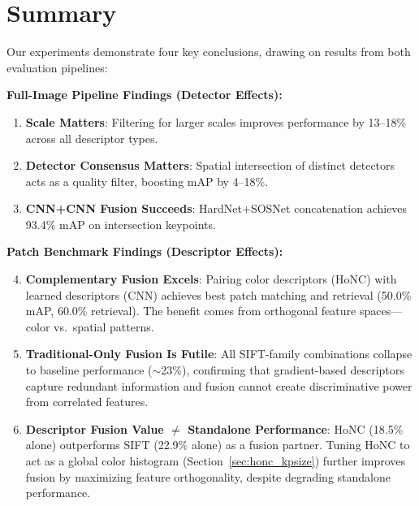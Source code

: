 \section{Summary}

Our experiments demonstrate four key conclusions, drawing on results from both evaluation pipelines:

\textbf{Full-Image Pipeline Findings (Detector Effects):}
\begin{enumerate}
    \item \textbf{Scale Matters}: Filtering for larger scales improves performance by 13--18\% across all descriptor types.
    \item \textbf{Detector Consensus Matters}: Spatial intersection of distinct detectors acts as a quality filter, boosting mAP by 4--18\%.
    \item \textbf{CNN+CNN Fusion Succeeds}: HardNet+SOSNet concatenation achieves 93.4\% mAP on intersection keypoints.
\end{enumerate}

\textbf{Patch Benchmark Findings (Descriptor Effects):}
\begin{enumerate}
    \setcounter{enumi}{3}
    \item \textbf{Complementary Fusion Excels}: Pairing color descriptors (HoNC) with learned descriptors (CNN) achieves best patch matching and retrieval (50.0\% mAP, 60.0\% retrieval). The benefit comes from orthogonal feature spaces---color vs.\ spatial patterns.
    \item \textbf{Traditional-Only Fusion Is Futile}: All SIFT-family combinations collapse to baseline performance ($\sim$23\%), confirming that gradient-based descriptors capture redundant information and fusion cannot create discriminative power from correlated features.
    \item \textbf{Descriptor Fusion Value $\neq$ Standalone Performance}: HoNC (18.5\% alone) outperforms SIFT (22.9\% alone) as a fusion partner. Tuning HoNC to act as a global color histogram (Section~\ref{sec:honc_kpsize}) further improves fusion by maximizing feature orthogonality, despite degrading standalone performance.
\end{enumerate}
